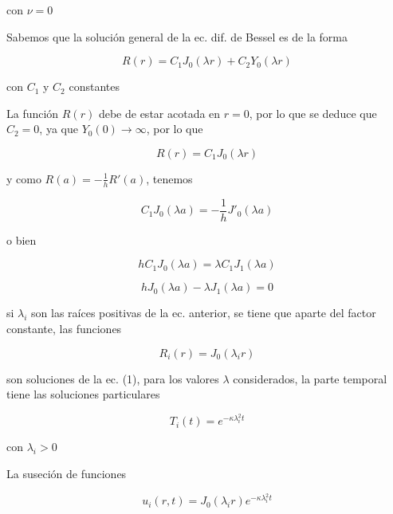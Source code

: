 \documentclass[12pt,a4paper]{article}
\begin{document}
\begin{enumerate}
   con $\nu = 0$
   
   Sabemos que la solución general de la ec. dif. de Bessel es de la forma 
   
   \begin{equation*}
       R(r)=C_1J_0(\lambda r)+C_2Y_0(\lambda r)
   \end{equation*}
   
   con $C_1$ y $C_2$ constantes
   
   La función $R(r)$ debe de estar acotada en $r=0$, por lo que se deduce que $C_2 = 0$, ya que $Y_0 (0) \rightarrow \infty$, por lo que
   
   \begin{equation*}
       R(r)=C_1J_0(\lambda r)
   \end{equation*}
   
   y como $R(a)=-\frac{1}{h}R'(a)$, tenemos
   
   \begin{equation*}
       C_1J_0(\lambda a)= -\frac{1}{h}J'_0(\lambda a)
   \end{equation*}
   
   o bien
   
   \begin{equation*}
       hC_1J_0(\lambda a) = \lambda C_1 J_1(\lambda a)
   \end{equation*}
   
   \begin{equation*}
       hJ_0(\lambda a)- \lambda J_1(\lambda a)=0
   \end{equation*}
   
   si $\lambda_i$ son las raíces positivas de la ec. anterior, se tiene que aparte del factor constante, las funciones
   
   \begin{equation*}
       R_i(r)=J_0(\lambda_i r)
   \end{equation*}
   
   son soluciones de la ec. (1), para los valores $\lambda$ considerados, la parte temporal tiene las soluciones particulares
   
   \begin{equation*}
       T_i(t)= e^{-\kappa \lambda_{i}^{2} t}
   \end{equation*}
   
   con $\lambda_i > 0$
   
   La suseción de funciones 
   
   \begin{equation*}
       u_i(r,t)= J_0(\lambda_i r) e^{-\kappa \lambda_{i}^{2}t}
   \end{equation*}
   

\end{enumerate}
\end{document}
